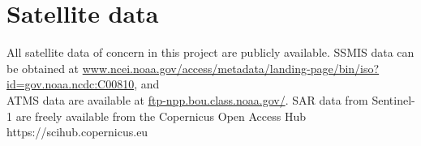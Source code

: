\documentclass[12pt,oneside,a4paper]{article}
\begin{document}
\section{Satellite data}
%
All satellite data of concern in this project are publicly available. SSMIS
data can be obtained at
\url{www.ncei.noaa.gov/access/metadata/landing-page/bin/iso?id=gov.noaa.ncdc:C00810},
and\\ATMS data are available at \url{ftp-npp.bou.class.noaa.gov/}. SAR data from Sentinel-1 are freely  available from the Copernicus Open Access Hub https://scihub.copernicus.eu

{\footnotesize
	
}
\end{document}

